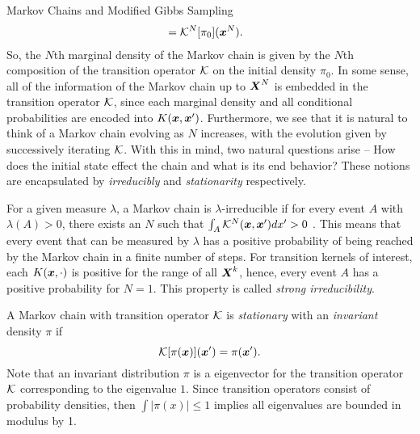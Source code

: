 \begin{chapter}{Markov Chains and Modified Gibbs Sampling}
\begin{align}
    &= \mathcal K^N [\pi_0](\mbox{\boldmath$x$}^N).
\end{align}
So, the $N$th marginal density of the Markov chain is given by the $N$th composition of the transition operator $\mathcal K$ on the initial density $\pi_0$.
In some sense, all of the information of the Markov chain up to $\mbox{\boldmath$X$}^N$ is embedded in the transition operator $\mathcal K$, since each marginal density and all conditional probabilities are encoded into $K(\mbox{\boldmath$x$}, \mbox{\boldmath$x$}')$.
Furthermore, we see that it is natural to think of a Markov chain evolving as $N$ increases, with the evolution given by successively iterating $\mathcal K$.
With this in mind, two natural questions arise -- How does the initial state effect the chain and what is its end behavior? 
These notions are encapsulated by \emph{irreducibly} and \emph{stationarity} respectively.

For a given measure $\lambda$, a Markov chain is $\lambda$-irreducible if for every event $A$ with $\lambda(A) > 0$, there exists an $N$ such that $\int_A \mathcal K^N(\mbox{\boldmath$x$},\mbox{\boldmath$x$}')dx'>0$ \citep{robert2013monte}. 
This means that every event that can be measured by $\lambda$ has a positive probability of being reached by the Markov chain in a finite number of steps.
For transition kernels of interest, each $K(\mbox{\boldmath$x$},\cdot)$ is positive for the range of all $\mbox{\boldmath$X$}^k$, hence, every event $A$ has a positive probability for $N=1$. 
This property is called \emph{strong irreducibility}.

A Markov chain with transition operator $\mathcal K$ is \emph{stationary} with an \emph{invariant} density $\pi$ if 
\begin{equation} \label{eq:stationarity}
  \mathcal K [\pi(\mbox{\boldmath$x$})](\mbox{\boldmath$x$}') = \pi(\mbox{\boldmath$x$}').
\end{equation}
Note that an invariant distribution $\pi$ is a eigenvector for the transition operator $\mathcal K$ corresponding to the eigenvalue $1$.
Since transition operators consist of probability densities, then $\int |\pi(x)| \le 1$ implies all eigenvalues are bounded in modulus by 1.


\end{chapter}
